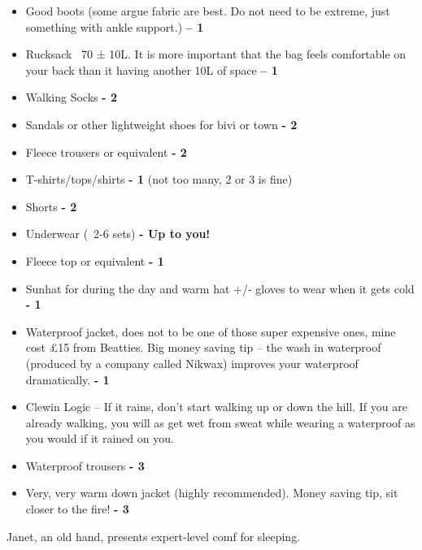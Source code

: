 \begin{itemize}
    \item Good boots (some argue fabric are best. Do not need to be extreme, just something with ankle support.) \textbf{– 1}
    \item Rucksack ~70 ± 10L. It is more important that the bag feels comfortable on your back than it having another 10L of space \textbf{– 1}
    \item Walking Socks \textbf{- 2}
    \item Sandals or other lightweight shoes for bivi or town \textbf{- 2}
    \item Fleece trousers or equivalent \textbf{- 2}
    \item T-shirts/tops/shirts \textbf{- 1} (not too many, 2 or 3 is fine)
    \item Shorts \textbf{- 2}
    \item Underwear (~2-6 sets) \textbf{- Up to you!}
    \item Fleece top or equivalent \textbf{- 1}
    \item Sunhat for during the day and warm hat +/- gloves to wear when it gets cold \textbf{- 1}
    \item Waterproof jacket, does not to be one of those super expensive ones, mine cost £15 from Beatties. Big money saving tip – the wash in waterproof  (produced by a company called Nikwax) improves your waterproof dramatically. \textbf{- 1}
        \item Clewin Logic – If it rains, don’t start walking up or down the hill. If you are already walking, you will as get wet from sweat while wearing a waterproof as you would if it rained on you.
    \item Waterproof trousers \textbf{- 3}
    \item Very, very warm down jacket (highly recommended). Money saving tip, sit closer to the fire! \textbf{- 3}
\end{itemize}


\begin{marginfigure}
\checkoddpage \ifoddpage \forcerectofloat \else \forceversofloat \fi
\centering
 \caption{Janet, an old hand, presents expert-level comf for sleeping. }
 \label{thermarest}
\end{marginfigure}

